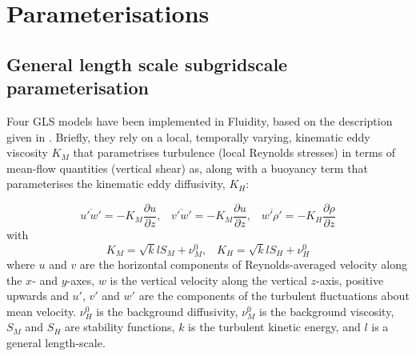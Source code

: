 \chapter{Parameterisations}\label{chap:parameterisations}

\section{General length scale subgridscale parameterisation}\label{Sec:GLS}

Four GLS models have been implemented in Fluidity, based on the description given in \citet{warner2005}.
Briefly, they rely on a local, temporally varying, kinematic eddy viscosity $K_M$ that parametrises 
turbulence (local Reynolds stresses) in terms of mean-flow quantities (vertical shear) as, along with a buoyancy term that 
parameterises the kinematic eddy diffusivity, $K_H$:

\begin{equation}
\overline{u'w'} = -K_M\frac{\partial u}{\partial z},\;\;\;
\overline{v'w'} = -K_M\frac{\partial u}{\partial z},\;\;\;
\overline{w'\rho'} = -K_H\frac{\partial\rho}{\partial z}
\end{equation} 
with
\begin{equation}
K_M = \sqrt{k}lS_M+\nu_M^0, \;\;\;
K_H = \sqrt{k}lS_H+\nu_H^0
\label{eq:diff}
\end{equation}
where $u$ and $v$ are the horizontal components of Reynolds-averaged velocity along the $x$- and $y$-axes, $w$ is 
the vertical velocity along the vertical $z$-axis, positive upwards and $u'$, $v'$ and $w'$ are the components 
of the turbulent fluctuations about mean velocity. $\nu_H^0$ is the background diffusivity, $\nu_M^0$ 
is the background viscosity, $S_M$ and $S_H$ are stability functions, 
$k$ is the turbulent kinetic energy, and $l$ is a general length-scale.

